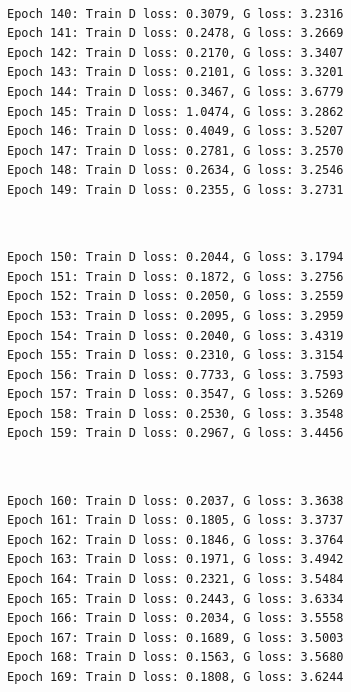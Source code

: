 \documentclass[11pt]{article}
\begin{document}
    \begin{center}
    \end{center}
    { \hspace*{\fill} \\}
    
    \begin{Verbatim}[commandchars=\\\{\}]
Epoch 140: Train D loss: 0.3079, G loss: 3.2316
Epoch 141: Train D loss: 0.2478, G loss: 3.2669
Epoch 142: Train D loss: 0.2170, G loss: 3.3407
Epoch 143: Train D loss: 0.2101, G loss: 3.3201
Epoch 144: Train D loss: 0.3467, G loss: 3.6779
Epoch 145: Train D loss: 1.0474, G loss: 3.2862
Epoch 146: Train D loss: 0.4049, G loss: 3.5207
Epoch 147: Train D loss: 0.2781, G loss: 3.2570
Epoch 148: Train D loss: 0.2634, G loss: 3.2546
Epoch 149: Train D loss: 0.2355, G loss: 3.2731

    \end{Verbatim}

    \begin{center}
    \end{center}
    { \hspace*{\fill} \\}
    
    \begin{Verbatim}[commandchars=\\\{\}]
Epoch 150: Train D loss: 0.2044, G loss: 3.1794
Epoch 151: Train D loss: 0.1872, G loss: 3.2756
Epoch 152: Train D loss: 0.2050, G loss: 3.2559
Epoch 153: Train D loss: 0.2095, G loss: 3.2959
Epoch 154: Train D loss: 0.2040, G loss: 3.4319
Epoch 155: Train D loss: 0.2310, G loss: 3.3154
Epoch 156: Train D loss: 0.7733, G loss: 3.7593
Epoch 157: Train D loss: 0.3547, G loss: 3.5269
Epoch 158: Train D loss: 0.2530, G loss: 3.3548
Epoch 159: Train D loss: 0.2967, G loss: 3.4456

    \end{Verbatim}

    \begin{center}
    \end{center}
    { \hspace*{\fill} \\}
    
    \begin{Verbatim}[commandchars=\\\{\}]
Epoch 160: Train D loss: 0.2037, G loss: 3.3638
Epoch 161: Train D loss: 0.1805, G loss: 3.3737
Epoch 162: Train D loss: 0.1846, G loss: 3.3764
Epoch 163: Train D loss: 0.1971, G loss: 3.4942
Epoch 164: Train D loss: 0.2321, G loss: 3.5484
Epoch 165: Train D loss: 0.2443, G loss: 3.6334
Epoch 166: Train D loss: 0.2034, G loss: 3.5558
Epoch 167: Train D loss: 0.1689, G loss: 3.5003
Epoch 168: Train D loss: 0.1563, G loss: 3.5680
Epoch 169: Train D loss: 0.1808, G loss: 3.6244

    \end{Verbatim}
\end{document}
